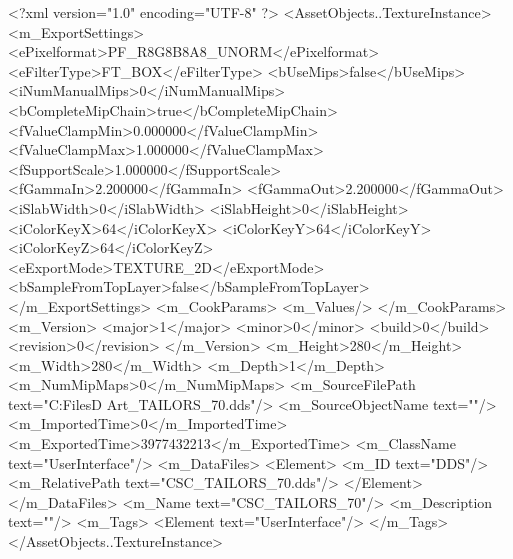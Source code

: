 <?xml version="1.0" encoding="UTF-8" ?>
<AssetObjects..TextureInstance>
	<m_ExportSettings>
		<ePixelformat>PF_R8G8B8A8_UNORM</ePixelformat>
		<eFilterType>FT_BOX</eFilterType>
		<bUseMips>false</bUseMips>
		<iNumManualMips>0</iNumManualMips>
		<bCompleteMipChain>true</bCompleteMipChain>
		<fValueClampMin>0.000000</fValueClampMin>
		<fValueClampMax>1.000000</fValueClampMax>
		<fSupportScale>1.000000</fSupportScale>
		<fGammaIn>2.200000</fGammaIn>
		<fGammaOut>2.200000</fGammaOut>
		<iSlabWidth>0</iSlabWidth>
		<iSlabHeight>0</iSlabHeight>
		<iColorKeyX>64</iColorKeyX>
		<iColorKeyY>64</iColorKeyY>
		<iColorKeyZ>64</iColorKeyZ>
		<eExportMode>TEXTURE_2D</eExportMode>
		<bSampleFromTopLayer>false</bSampleFromTopLayer>
	</m_ExportSettings>
	<m_CookParams>
		<m_Values/>
	</m_CookParams>
	<m_Version>
		<major>1</major>
		<minor>0</minor>
		<build>0</build>
		<revision>0</revision>
	</m_Version>
	<m_Height>280</m_Height>
	<m_Width>280</m_Width>
	<m_Depth>1</m_Depth>
	<m_NumMipMaps>0</m_NumMipMaps>
	<m_SourceFilePath text="C:\Users\Shadow\Desktop\Working Files\2D Art\Quarters\Tailors\CSC_TAILORS_70.dds"/>
	<m_SourceObjectName text=""/>
	<m_ImportedTime>0</m_ImportedTime>
	<m_ExportedTime>3977432213</m_ExportedTime>
	<m_ClassName text="UserInterface"/>
	<m_DataFiles>
		<Element>
			<m_ID text="DDS"/>
			<m_RelativePath text="CSC_TAILORS_70.dds"/>
		</Element>
	</m_DataFiles>
	<m_Name text="CSC_TAILORS_70"/>
	<m_Description text=""/>
	<m_Tags>
		<Element text="UserInterface"/>
	</m_Tags>
</AssetObjects..TextureInstance>

